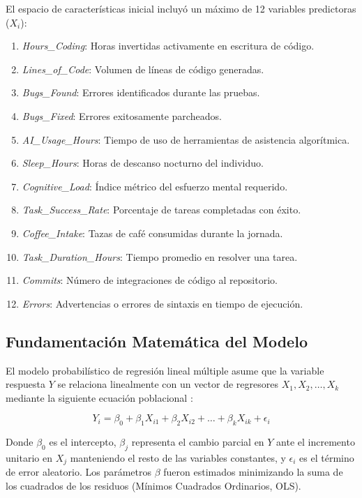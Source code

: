 \documentclass[procedia]{easychair}
\begin{document}
El espacio de características inicial incluyó un máximo de 12 variables predictoras ($X_i$):
\begin{enumerate}
    \item \textit{Hours\_Coding}: Horas invertidas activamente en escritura de código.
    \item \textit{Lines\_of\_Code}: Volumen de líneas de código generadas.
    \item \textit{Bugs\_Found}: Errores identificados durante las pruebas.
    \item \textit{Bugs\_Fixed}: Errores exitosamente parcheados.
    \item \textit{AI\_Usage\_Hours}: Tiempo de uso de herramientas de asistencia algorítmica.
    \item \textit{Sleep\_Hours}: Horas de descanso nocturno del individuo.
    \item \textit{Cognitive\_Load}: Índice métrico del esfuerzo mental requerido.
    \item \textit{Task\_Success\_Rate}: Porcentaje de tareas completadas con éxito.
    \item \textit{Coffee\_Intake}: Tazas de café consumidas durante la jornada.
    \item \textit{Task\_Duration\_Hours}: Tiempo promedio en resolver una tarea.
    \item \textit{Commits}: Número de integraciones de código al repositorio.
    \item \textit{Errors}: Advertencias o errores de sintaxis en tiempo de ejecución.
\end{enumerate}

\subsection{Fundamentación Matemática del Modelo}
El modelo probabilístico de regresión lineal múltiple asume que la variable respuesta $Y$ se relaciona linealmente con un vector de regresores $X_1, X_2, \dots, X_k$ mediante la siguiente ecuación poblacional \cite{kutner}:

\begin{equation}
Y_i = \beta_0 + \beta_1 X_{i1} + \beta_2 X_{i2} + \dots + \beta_k X_{ik} + \epsilon_i
\end{equation}

Donde $\beta_0$ es el intercepto, $\beta_j$ representa el cambio parcial en $Y$ ante el incremento unitario en $X_j$ manteniendo el resto de las variables constantes, y $\epsilon_i$ es el término de error aleatorio. Los parámetros $\beta$ fueron estimados minimizando la suma de los cuadrados de los residuos (Mínimos Cuadrados Ordinarios, OLS).
\end{document}
